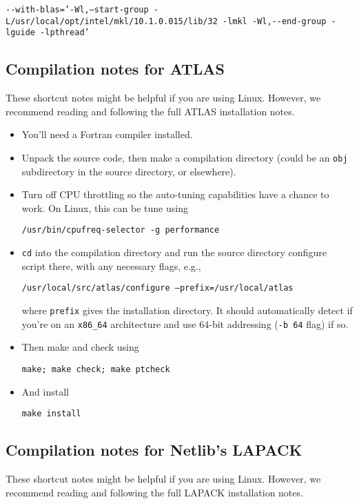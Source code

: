\documentclass[12pt]{article}
\begin{document}
    {\tt -}{\tt -with-blas='-Wl,--start-group -L/usr/local/opt/intel/mkl/10.1.0.015/lib/32 -lmkl -Wl,}{\tt -}{\tt -end-group -lguide -lpthread'}

\subsection{Compilation notes for ATLAS}
   These shortcut notes might be helpful if you are using Linux.  However,
   we recommend reading and following the full ATLAS installation notes.

   \begin{itemize}
   
   \item
   You'll need a Fortran compiler installed.

   \item
   Unpack the source code, then make a compilation directory (could
   be an {\tt obj} subdirectory in the source directory, or elsewhere).

   \item
   Turn off CPU throttling so the auto-tuning capabilities have a chance
   to work.  On Linux, this can be tune using

     {\tt /usr/bin/cpufreq-selector -g performance}

   \item
   {\tt cd} into the compilation directory and run the source
   directory configure script there, with any necessary flags, e.g.,
 
     {\tt /usr/local/src/atlas/configure --prefix=/usr/local/atlas}

   where {\tt prefix} gives the installation directory.
   It should automatically detect if you're on an {\tt x86\_64} 
   architecture and use 64-bit addressing ({\tt -b 64} flag) if so.

   \item
   Then make and check using

     {\tt make; make check; make ptcheck}

   \item
   And install

     {\tt make install}
   \end{itemize}

\subsection{Compilation notes for Netlib's LAPACK}
   These shortcut notes might be helpful if you are using Linux.  However,
   we recommend reading and following the full LAPACK installation notes.
\end{document}
